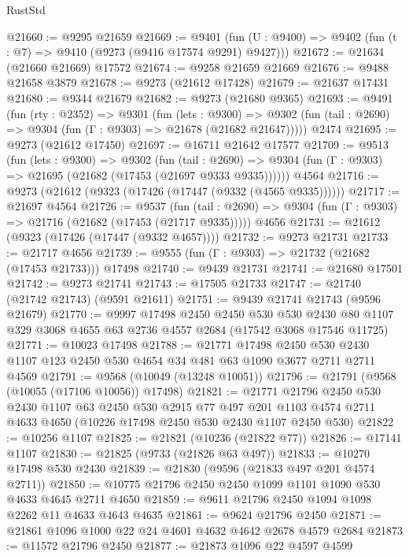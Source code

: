 \begin{lexlean}{RustStd}
\begin{coremodule}
{\begin{coremodule}
{{{{{{{{{{{{{{{{{{{{{{{{{{{{{{{{{{{{{{{{{{{{{{{{{{{{{{{@21660 := @9295 @21659
@21669 := @9401
    (fun (U : @9400) => @9402 (fun (t : @7) => @9410 (@9273 (@9416 @17574 @9291) @9427)))
@21672 := @21634 (@21660 @21669) @17572
@21674 := @9258 @21659 @21669
@21676 := @9488 @21658 @3879
@21678 := @9273 (@21612 @17428)
@21679 := @21637 @17431
@21680 := @9344 @21679
@21682 := @9273 (@21680 @9365)
@21693 := @9491
    (fun (rty : @2352) =>
    @9301
      (fun (lets : @9300) =>
      @9302 (fun (tail : @2690) => @9304 (fun (Γ : @9303) => @21678 (@21682 @21647)))))
    @2474
@21695 := @9273 (@21612 @17450)
@21697 := @16711 @21642 @17577
@21709 := @9513
    (fun (lets : @9300) =>
    @9302
      (fun (tail : @2690) =>
      @9304 (fun (Γ : @9303) => @21695 (@21682 (@17453 (@21697 @9333 @9335))))))
    @4564
@21716 := @9273 (@21612 (@9323 (@17426 (@17447 (@9332 (@4565 @9335))))))
@21717 := @21697 @4564
@21726 := @9537
    (fun (tail : @2690) => @9304 (fun (Γ : @9303) => @21716 (@21682 (@17453 (@21717 @9335)))))
    @4656
@21731 := @21612 (@9323 (@17426 (@17447 (@9332 @4657))))
@21732 := @9273 @21731
@21733 := @21717 @4656
@21739 := @9555 (fun (Γ : @9303) => @21732 (@21682 (@17453 @21733))) @17498
@21740 := @9439 @21731
@21741 := @21680 @17501
@21742 := @9273 @21741
@21743 := @17505 @21733
@21747 := @21740 (@21742 @21743) (@9591 @21611)
@21751 := @9439 @21741 @21743 (@9596 @21679)
@21770 := @9997
    @17498
    @2450
    @2450
    @530
    @530
    @2430
    @80
    @1107
    @329
    @3068
    @4655
    @63
    @2736
    @4557
    @2684
    (@17542 @3068 @17546 @11725)
@21771 := @10023 @17498
@21788 := @21771
    @17498
    @2450
    @530
    @2430
    @1107
    @123
    @2450
    @530
    @4654
    @34
    @481
    @63
    @1090
    @3677
    @2711
    @2711
    @4569
@21791 := @9568 (@10049 (@13248 @10051))
@21796 := @21791 (@9568 (@10055 (@17106 @10056)) @17498)
@21821 := @21771
    @21796
    @2450
    @530
    @2430
    @1107
    @63
    @2450
    @530
    @2915
    @77
    @497
    @201
    @1103
    @4574
    @2711
    @4633
    @4650
    (@10226 @17498 @2450 @530 @2430 @1107 @2450 @530)
@21822 := @10256 @1107
@21825 := @21821 (@10236 (@21822 @77))
@21826 := @17141 @1107
@21830 := @21825 (@9733 (@21826 @63 @497))
@21833 := @10270 @17498 @530 @2430
@21839 := @21830 (@9596 (@21833 @497 @201 @4574 @2711))
@21850 := @10775 @21796 @2450 @2450 @1099 @1101 @1090 @530 @4633 @4645 @2711 @4650
@21859 := @9611 @21796 @2450 @1094 @1098 @2262 @11 @4633 @4643 @4635
@21861 := @9624 @21796 @2450
@21871 := @21861 @1096 @1000 @22 @24 @4601 @4632 @4642 @2678 @4579 @2684
@21873 := @11572 @21796 @2450
@21877 := @21873 @1096 @22 @4597 @4599
}}}}}}}}}}}}}}}}}}}}}}}}}}}}}}}}}}}}}}}}}}}}}}}}}}}}}}}
\end{coremodule}}
\end{coremodule}
\end{lexlean}
